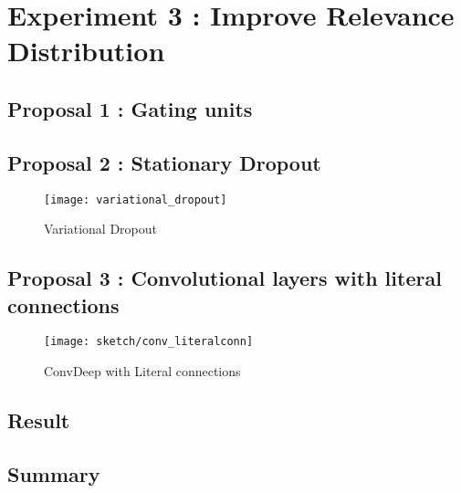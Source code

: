 \section{Experiment 3 : Improve Relevance Distribution}

\subsection{Proposal 1 : Gating units}

\subsection{Proposal 2 :  Stationary Dropout}

 \begin{figure}[h]
\centering
\texttt{[image: variational\_dropout]}
\caption{Variational Dropout\cite{GalTheoreticallyGroundedApplication2016}}
\label{fig:variational_dropout}
\end{figure}

\subsection{Proposal 3 : Convolutional layers with literal connections}

 \begin{figure}[h]
\centering
\texttt{[image: sketch/conv\_literalconn]}
\caption{ConvDeep with Literal connections} 
\label{fig:conv_literalconn}
\end{figure}

\subsection{Result}

\subsection{Summary}

